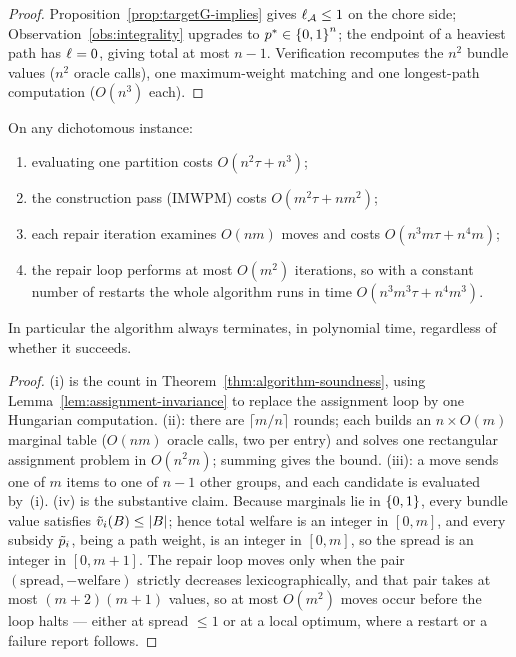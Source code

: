 \begin{proof}
Proposition~\ref{prop:targetG-implies} gives $\ell_{\mathcal{A}} \le 1$ on the
chore side; Observation~\ref{obs:integrality} upgrades to
$p^{*} \in \left\{0,1\right\}^n$; the endpoint of a heaviest path has
$\ell_{} = 0$, giving total at most $n-1$. Verification recomputes the $n^2$
bundle values ($n^2$ oracle calls), one maximum-weight matching and one
longest-path computation ($O(n^3)$ each).
\end{proof}

\begin{theorem}
\label{thm:algorithm-complexity}
On any dichotomous instance:
\begin{enumerate}
  \item[(i)] evaluating one partition costs $O(n^2 \tau + n^3)$;
  \item[(ii)] the construction pass (IMWPM) costs $O(m^2 \tau + n m^2)$;
  \item[(iii)] each repair iteration examines $O(nm)$ moves and costs
    $O(n^3 m \tau + n^4 m)$;
  \item[(iv)] the repair loop performs at most $O(m^2)$ iterations, so with a
    constant number of restarts the whole algorithm runs in time
    $O(n^3 m^3 \tau + n^4 m^3)$.
\end{enumerate}
In particular the algorithm always terminates, in polynomial time, regardless
of whether it succeeds.
\end{theorem}

\begin{proof}
(i) is the count in Theorem~\ref{thm:algorithm-soundness}, using
Lemma~\ref{lem:assignment-invariance} to replace the assignment loop by one
Hungarian computation. (ii): there are $\lceil m/n \rceil$ rounds; each builds
an $n \times O(m)$ marginal table ($O(nm)$ oracle calls, two per entry) and
solves one rectangular assignment problem in $O(n^2 m)$; summing gives the
bound. (iii): a move sends one of $m$ items to one of $n-1$ other groups, and
each candidate is evaluated by~(i). (iv) is the substantive claim. Because
marginals lie in $\left\{0,1\right\}$, every bundle value satisfies
$\tilde{v}_i(B) \le \left\lvert B\right\rvert$; hence total welfare is an integer in $[0, m]$,
and every subsidy $\tilde{p}_i$, being a path weight, is an integer in
$[0, m]$, so the spread is an integer in $[0, m + 1]$. The repair loop moves
only when the pair $(\text{spread}, -\text{welfare})$ strictly decreases
lexicographically, and that pair takes at most $(m+2)(m+1)$ values, so at most
$O(m^2)$ moves occur before the loop halts --- either at spread $\le 1$ or at
a local optimum, where a restart or a failure report follows.
\end{proof}

